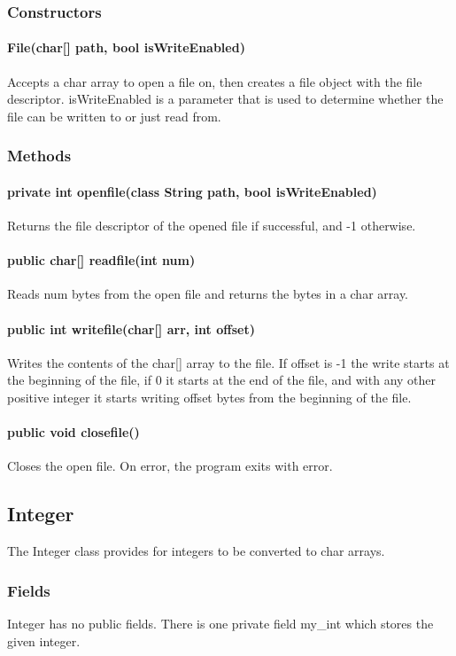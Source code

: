 \begin{homeworkProblem}
	\subsubsection{Constructors}
	\paragraph{File(char[] path, bool isWriteEnabled)}
	Accepts a char array to open a file on, then creates a file object with the file descriptor. isWriteEnabled is a parameter that is used to determine whether the file can be written to or just read from.
	
	\subsubsection{Methods}
	\paragraph{private int openfile(class String path, bool isWriteEnabled)}
	Returns the file descriptor of the opened file if successful, and -1 otherwise. 
	\paragraph{public char[] readfile(int num)}
	Reads num bytes from the open file and returns the bytes in a char array.
	\paragraph{public int writefile(char[] arr, int offset)}
	Writes the contents of the char[] array to the file. If offset is -1 the write starts at the beginning of the file, if 0 it starts at the end of the file, and with any other positive integer it starts writing offset bytes from the beginning of the file.
	\paragraph{public void closefile()}
	Closes the open file. On error, the program exits with error.
	
	\subsection{Integer}
	The Integer class provides for integers to be converted to char arrays.
	\subsubsection{Fields}
	Integer has no public fields. There is one private field my\_int which stores the given integer.
	

\end{homeworkProblem}
